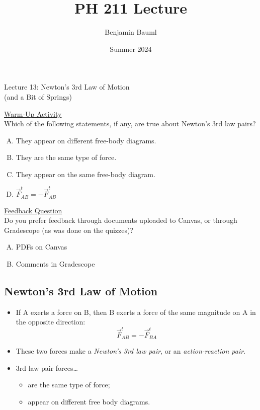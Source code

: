 \documentclass[]{article}
\title{PH 211 Lecture \Week}
\author{Benjamin Bauml}
\date{Summer 2024}
\newcommand{\Week}{13}
\begin{document}
\begin{TeacherMargin}

\end{TeacherMargin}
\begin{PresentSpace}
\begin{center}
	\huge Lecture \Week: Newton's 3rd Law of Motion \\
	\small (and a Bit of Springs)
\end{center}
\vspace{0.5cm}
\underline{Warm-Up Activity} \\
Which of the following statements, if any, are true about Newton's 3rd law pairs?
\begin{enumerate}[(A)]
	\item They appear on different free-body diagrams.
	\item They are the same type of force.
	\item They appear on the same free-body diagram.
	\item $\vec{F}^{t}_{AB} = -\vec{F}^{t}_{AB}$
\end{enumerate}
\vspace{1cm}
\underline{Feedback Question} \\
Do you prefer feedback through documents uploaded to Canvas, or through Gradescope (as was done on the quizzes)?
\begin{enumerate}[(A)]
	\item PDFs on Canvas
	\item Comments in Gradescope
\end{enumerate}
\end{PresentSpace}
\newpage
\begin{TeacherMargin}

\end{TeacherMargin}
\begin{PresentSpace}
\vspace{-10pt}
\section*{Newton's 3rd Law of Motion}
\vspace{-10pt}
\begin{itemize}
	\item If A exerts a force on B, then B exerts a force of the same magnitude on A in the opposite direction:
	\[
	\vec{F}^{t}_{AB} = -\vec{F}^{t}_{BA}
	\]
	\item These two forces make a \textit{Newton's 3rd law pair}, or an \textit{action-reaction pair}.
	\item 3rd law pair forces\dots
	\begin{itemize}
		\item are the same type of force;
		\item appear on different free body diagrams.
	\end{itemize}
\end{itemize}
\end{PresentSpace}
\end{document}
